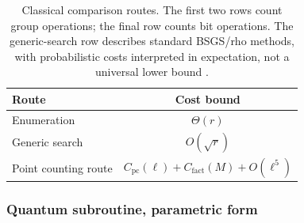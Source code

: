 \begin{table}[t]
    \color{blue}
    \centering
    \small
    \caption{Classical comparison routes. The first two rows count group operations; the final row counts bit operations. The generic-search row describes standard BSGS/rho methods, with probabilistic costs interpreted in expectation, not a universal lower bound \cite{Sutherland2007}.}
    \label{tab:classical_routes}
    \begin{tabular}{lc}
        \hline
        Route & Cost bound \\
        \hline
        Enumeration & $\Theta(r)$ \\
        Generic search & $O(\sqrt{r})$ \\
        Point counting route &
        $C_{\mathrm{pc}}(\ell)+C_{\mathrm{fact}}(M)
        +O(\ell^5)$ \\
        \hline
    \end{tabular}
\end{table}

\subsubsection{Quantum subroutine, parametric form}

